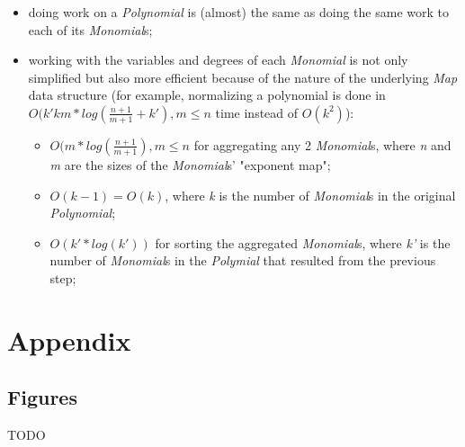 \documentclass[11pt,a4paper]{article}
\begin{document}
    \begin{itemize}
        \item doing work on a \textit{Polynomial} is (almost) the same as doing the same work to each of its \textit{Monomial}s;
        \item working with the variables and degrees of each \textit{Monomial} is not only simplified but also more efficient because of the nature of the underlying \textit{Map} data structure (for example, normalizing a polynomial is done in \( O(k'km*log( \frac{n+1}{m+1} + k'), m \leq n \) time instead of \( O(k^2) \)):
        \begin{itemize}
            \item \( O(m*log( \frac{n+1}{m+1}), m \leq n \) for aggregating any 2 \textit{Monomial}s, where \textit{n} and \textit{m} are the sizes of the \textit{Monomial}s' "exponent map";
            \item \( O(k-1) = O(k) \), where \textit{k} is the number of \textit{Monomial}s in the original \textit{Polynomial};
            \item \( O(k'*log(k')) \) for sorting the aggregated \textit{Monomial}s, where \textit{k'} is the number of \textit{Monomial}s in the \textit{Polymial} that resulted from the previous step;
        \end{itemize} 

    \end{itemize}

\pagebreak

\appendix
\section{Appendix}

\subsection{Figures}

TODO
\end{document}
